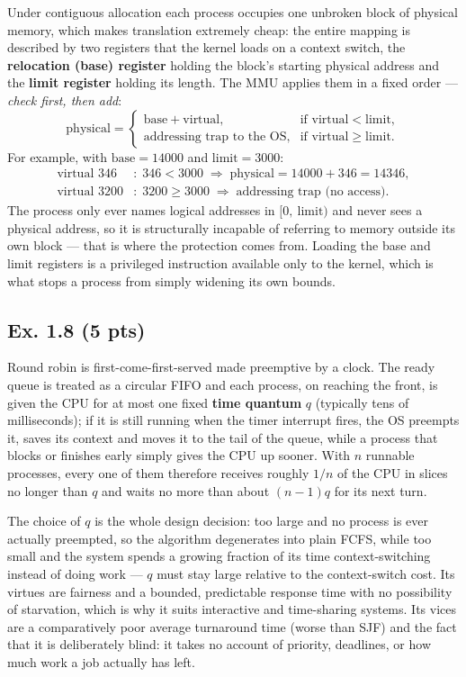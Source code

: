 Under contiguous allocation each process occupies one unbroken block of physical memory,
which makes translation extremely cheap: the entire mapping is described by two registers
that the kernel loads on a context switch, the \textbf{relocation (base) register} holding
the block's starting physical address and the \textbf{limit register} holding its length.
The MMU applies them in a fixed order --- \emph{check first, then add}:
%
\begin{equation}
  \label{p2:eq:reloc}
  \text{physical} =
  \begin{cases}
    \text{base} + \text{virtual}, & \text{if } \text{virtual} < \text{limit},\\[2pt]
    \text{addressing trap to the OS}, & \text{if } \text{virtual} \ge \text{limit}.
  \end{cases}
\end{equation}
%
For example, with $\text{base} = 14000$ and $\text{limit} = 3000$:
%
\begin{align*}
  \text{virtual } 346 &: \; 346 < 3000 \;\Rightarrow\; \text{physical} = 14000 + 346 = 14346,\\
  \text{virtual } 3200 &: \; 3200 \ge 3000 \;\Rightarrow\; \text{addressing trap (no access)}.
\end{align*}
%
The process only ever names logical addresses in $[0,\ \text{limit})$ and never sees a
physical address, so it is structurally incapable of referring to memory outside its own
block --- that is where the protection comes from. Loading the base and limit registers is
a privileged instruction available only to the kernel, which is what stops a process from
simply widening its own bounds.

\subsection*{Ex. 1.8 (5 pts)}

Round robin is first-come-first-served made preemptive by a clock. The ready queue is
treated as a circular FIFO and each process, on reaching the front, is given the CPU for
at most one fixed \textbf{time quantum} $q$ (typically tens of milliseconds); if it is
still running when the timer interrupt fires, the OS preempts it, saves its context and
moves it to the tail of the queue, while a process that blocks or finishes early simply
gives the CPU up sooner. With $n$ runnable processes, every one of them therefore receives
roughly $1/n$ of the CPU in slices no longer than $q$ and waits no more than about
$(n-1)q$ for its next turn.

The choice of $q$ is the whole design decision: too large and no process is ever actually
preempted, so the algorithm degenerates into plain FCFS, while too small and the system
spends a growing fraction of its time context-switching instead of doing work --- $q$ must
stay large relative to the context-switch cost. Its virtues are fairness and a bounded,
predictable response time with no possibility of starvation, which is why it suits
interactive and time-sharing systems. Its vices are a comparatively poor average
turnaround time (worse than SJF) and the fact that it is deliberately blind: it takes no
account of priority, deadlines, or how much work a job actually has left.
